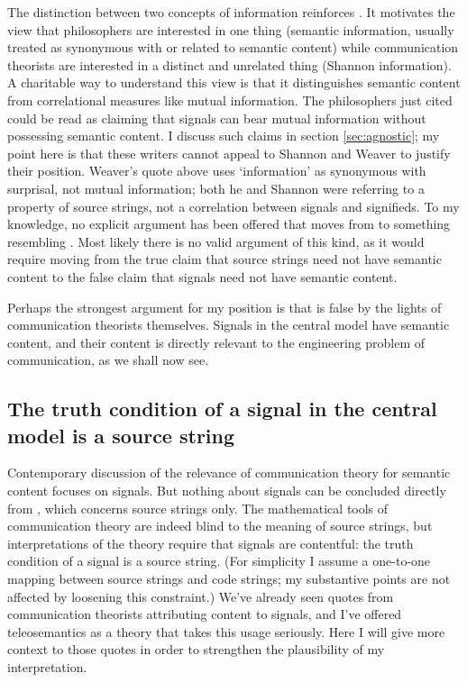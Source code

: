 \documentclass[12pt]{article}
\begin{document}
The distinction between two concepts of information reinforces \tic{}.
It motivates the view that philosophers are interested in one thing (semantic information, usually treated as synonymous with or related to semantic content) while communication theorists are interested in a distinct and unrelated thing (Shannon information).
A charitable way to understand this view is that it distinguishes semantic content from correlational measures like mutual information.
The philosophers just cited could be read as claiming that signals can bear mutual information without possessing semantic content.
I discuss such claims in section \ref{sec:agnostic}; my point here is that these writers cannot appeal to Shannon and Weaver to justify their position.
Weaver's quote above uses `information' as synonymous with surprisal, not mutual information; both he and Shannon were referring to a property of source strings, not a correlation between signals and signifieds.
To my knowledge, no explicit argument has been offered that moves from \sw{} to something resembling \tic{}.
Most likely there is no valid argument of this kind, as it would require moving from the true claim that source strings need not have semantic content to the false claim that signals need not have semantic content.

Perhaps the strongest argument for my position is that \tic{} is false by the lights of communication theorists themselves.
Signals in the central model have semantic content, and their content is directly relevant to the engineering problem of communication, as we shall now see.


\subsection{The truth condition of a signal in the central model is a source string}\label{subsec:signalContent}

Contemporary discussion of the relevance of communication theory for semantic content focuses on signals.
But nothing about signals can be concluded directly from \sw{}, which concerns source strings only.
The mathematical tools of communication theory are indeed blind to the meaning of source strings, but interpretations of the theory require that signals are contentful: the truth condition of a signal is a source string.
(For simplicity I assume a one-to-one mapping between source strings and code strings; my substantive points are not affected by loosening this constraint.)
We've already seen quotes from communication theorists attributing content to signals, and I've offered teleosemantics as a theory that takes this usage seriously.
Here I will give more context to those quotes in order to strengthen the plausibility of my interpretation.
\end{document}
